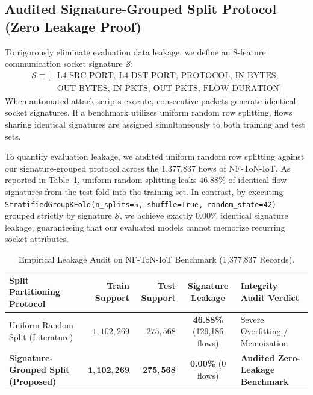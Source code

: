 \documentclass[12pt,a4paper]{report}
\begin{document}
\subsection{Audited Signature-Grouped Split Protocol (Zero Leakage Proof)}
To rigorously eliminate evaluation data leakage, we define an 8-feature communication socket signature $\mathcal{S}$:
\begin{equation}
\begin{split}
\mathcal{S} \equiv \big[ & \text{L4\_SRC\_PORT}, \, \text{L4\_DST\_PORT}, \, \text{PROTOCOL}, \, \text{IN\_BYTES}, \\
& \text{OUT\_BYTES}, \, \text{IN\_PKTS}, \, \text{OUT\_PKTS}, \, \text{FLOW\_DURATION} \big]
\end{split}
\label{eq:signature}
\end{equation}
When automated attack scripts execute, consecutive packets generate identical socket signatures. If a benchmark utilizes uniform random row splitting, flows sharing identical signatures are assigned simultaneously to both training and test sets.

To quantify evaluation leakage, we audited uniform random row splitting against our signature-grouped protocol across the 1,377,837 flows of NF-ToN-IoT. As reported in Table~\ref{tab:leakage_audit}, uniform random splitting leaks $46.88\%$ of identical flow signatures from the test fold into the training set. In contrast, by executing \texttt{StratifiedGroupKFold(n\_splits=5, shuffle=True, random\_state=42)} grouped strictly by signature $\mathcal{S}$, we achieve exactly $0.00\%$ identical signature leakage, guaranteeing that our evaluated models cannot memorize recurring socket attributes.

\begin{table}[H]
\centering
\caption{Empirical Leakage Audit on NF-ToN-IoT Benchmark (1,377,837 Records).}
\label{tab:leakage_audit}
\begin{tabularx}{\textwidth}{l r r c X}
\toprule
\textbf{Split Partitioning Protocol} & \textbf{Train Support} & \textbf{Test Support} & \textbf{Signature Leakage} & \textbf{Integrity Audit Verdict} \\
\midrule
Uniform Random Split (Literature) & $1,102,269$ & $275,568$ & \textbf{46.88\%} (129,186 flows) & Severe Overfitting / Memoization \\
\textbf{Signature-Grouped Split (Proposed)} & $\mathbf{1,102,269}$ & $\mathbf{275,568}$ & \textbf{0.00\%} (0 flows) & \textbf{Audited Zero-Leakage Benchmark} \\
\bottomrule
\end{tabularx}
\end{table}
\end{document}
